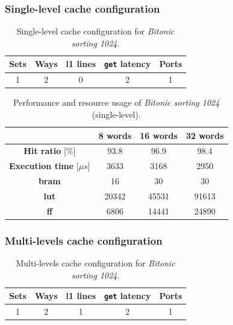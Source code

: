 \documentclass[11pt,a4paper,oneside]{memoir}
\begin{document}
\subsubsection{Single-level cache configuration}
\begin{table}[H]
	\begin{center}
		\begin{tabular}{ccccc}
			\hline
			\rowcolor{gray!50}
			\textbf{Sets} & \textbf{Ways} & \textbf{\ac{l1} lines} &
			\textbf{\texttt{get} latency} & \textbf{Ports} \\
			\hline
			1 & 2 & 0 & 2 & 1 \\
			\hline
		\end{tabular}
	\end{center}
	\caption{Single-level cache configuration for \emph{Bitonic sorting 1024}.}
	\label{tab:bitonic_1024_no_l1_config}
\end{table}

\begin{table}[H]
	\begin{center}
		\begin{tabular}{cccc}
			\hline
			\rowcolor{gray!50}
			& \textbf{8 words} & \textbf{16 words} & \textbf{32 words} \\
			\hline
			\textbf{Hit ratio} [\%] & 93.8 & 96.9 & 98.4 \\
			\rowcolor{gray!25}
			\textbf{Execution time} [$\mu s$] & 3633 & 3168 & 2950 \\
			\textbf{\ac{bram}} & 16 & 30 & 30 \\
			\rowcolor{gray!25}
			\textbf{\acs{lut}} & 20342 & 45531 & 91613 \\
			\textbf{\acs{ff}} & 6806 & 14441 & 24890 \\
			\hline
		\end{tabular}
	\end{center}
	\caption{Performance and resource usage of \emph{Bitonic sorting 1024}
	(single-level).}
	\label{tab:bitonic_1024_no_l1_report}
\end{table}

\subsubsection{Multi-levels cache configuration}
\begin{table}[!htb]
	\begin{center}
		\begin{tabular}{ccccc}
			\hline
			\rowcolor{gray!50}
			\textbf{Sets} & \textbf{Ways} & \textbf{\ac{l1} lines} &
			\textbf{\texttt{get} latency} & \textbf{Ports} \\
			\hline
			1 & 2 & 1 & 2 & 1 \\
			\hline
		\end{tabular}
	\end{center}
	\caption{Multi-levels cache configuration for \emph{Bitonic sorting 1024}.}
	\label{tab:bitonic_1024_l1_config}
\end{table}
\end{document}
